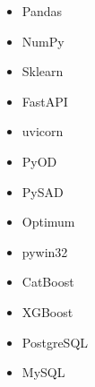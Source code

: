 \documentclass[11pt,a4paper, serif]{moderncv}
\begin{document}
\begin{english}
\begin{cvcolumns}
{\begin{itemize}
    	  		\item Pandas
    	  		\item NumPy
    	  		\item Sklearn
    	  		\item FastAPI
    	  		\item uvicorn
    	  		\item PyOD
    	  		\item PySAD
    	  		\item Optimum
    	  		\item pywin32
    	  		\item CatBoost
    	  		\item XGBoost
    	  		\item PostgreSQL
    	  		\item MySQL
    	  	\end{itemize}}
	\end{cvcolumns}
\end{english}
\end{document}
